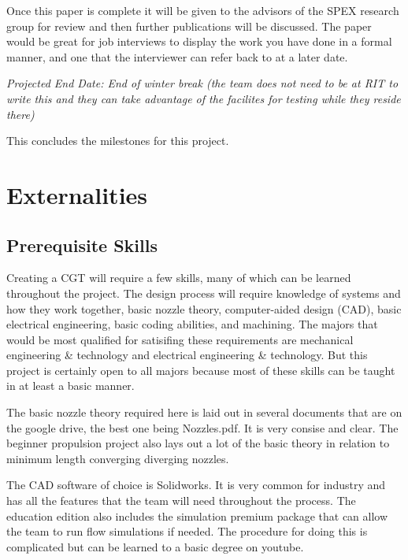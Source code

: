 \documentclass[conference]{IEEEtran} %
\begin{document}
    Once this paper is complete it will be given to the advisors of the SPEX research group for review and then further publications will be discussed. The paper would
    be great for job interviews to display the work you have done in a formal manner, and one that the interviewer can refer back to at a later date.

    \textit{Projected End Date: End of winter break (the team does not need to be at RIT to write this and they can take advantage of the facilites for testing while they reside there)}

This concludes the milestones for this project.

\section{Externalities}
\subsection{Prerequisite Skills}

Creating a CGT will require a few skills, many of which can be learned throughout the project. The design process will require knowledge of systems and how they
work together, basic nozzle theory, computer-aided design (CAD), basic electrical engineering, basic coding abilities, and machining. The majors that would
be most qualified for satisifing these requirements are mechanical engineering \& technology and electrical engineering \& technology. But this project is certainly
open to all majors because most of these skills can be taught in at least a basic manner.

The basic nozzle theory required here is laid out in several documents
that are on the google drive, the best one being Nozzles.pdf. It is very consise and clear. The beginner propulsion project also lays out a lot of the basic theory in
relation to minimum length converging diverging nozzles.

 The CAD software of choice is Solidworks. It is very common for industry and has all the features that the team
will need throughout the process. The education edition also includes the simulation premium package that can allow the team to run flow simulations if needed. The procedure for
doing this is complicated but can be learned to a basic degree on youtube.
\end{document}
